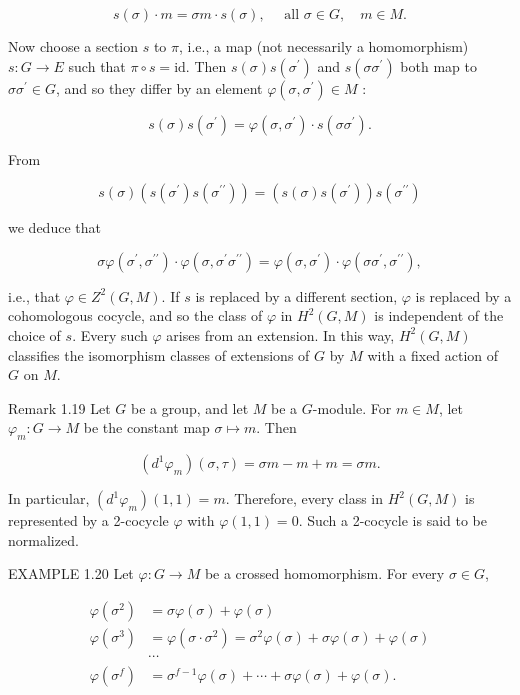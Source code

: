 \documentclass[10pt]{article}
\begin{document}
$$
s(\sigma) \cdot m=\sigma m \cdot s(\sigma), \quad \text { all } \sigma \in G, \quad m \in M .
$$

Now choose a section $s$ to $\pi$, i.e., a map (not necessarily a homomorphism) $s: G \rightarrow E$ such that $\pi \circ s=\mathrm{id}$. Then $s(\sigma) s\left(\sigma^{\prime}\right)$ and $s\left(\sigma \sigma^{\prime}\right)$ both map to $\sigma \sigma^{\prime} \in G$, and so they differ by an element $\varphi\left(\sigma, \sigma^{\prime}\right) \in M$ :

$$
s(\sigma) s\left(\sigma^{\prime}\right)=\varphi\left(\sigma, \sigma^{\prime}\right) \cdot s\left(\sigma \sigma^{\prime}\right) .
$$

From

$$
s(\sigma)\left(s\left(\sigma^{\prime}\right) s\left(\sigma^{\prime \prime}\right)\right)=\left(s(\sigma) s\left(\sigma^{\prime}\right)\right) s\left(\sigma^{\prime \prime}\right)
$$

we deduce that

$$
\sigma \varphi\left(\sigma^{\prime}, \sigma^{\prime \prime}\right) \cdot \varphi\left(\sigma, \sigma^{\prime} \sigma^{\prime \prime}\right)=\varphi\left(\sigma, \sigma^{\prime}\right) \cdot \varphi\left(\sigma \sigma^{\prime}, \sigma^{\prime \prime}\right),
$$

i.e., that $\varphi \in Z^{2}(G, M)$. If $s$ is replaced by a different section, $\varphi$ is replaced by a cohomologous cocycle, and so the class of $\varphi$ in $H^{2}(G, M)$ is independent of the choice of $s$. Every such $\varphi$ arises from an extension. In this way, $H^{2}(G, M)$ classifies the isomorphism classes of extensions of $G$ by $M$ with a fixed action of $G$ on $M$.

Remark 1.19 Let $G$ be a group, and let $M$ be a $G$-module. For $m \in M$, let $\varphi_{m}: G \rightarrow M$ be the constant map $\sigma \mapsto m$. Then

$$
\left(d^{1} \varphi_{m}\right)(\sigma, \tau)=\sigma m-m+m=\sigma m .
$$

In particular, $\left(d^{1} \varphi_{m}\right)(1,1)=m$. Therefore, every class in $H^{2}(G, M)$ is represented by a 2-cocycle $\varphi$ with $\varphi(1,1)=0$. Such a 2-cocycle is said to be normalized.

EXAMPLE 1.20 Let $\varphi: G \rightarrow M$ be a crossed homomorphism. For every $\sigma \in G$,

$$
\begin{aligned}
\varphi\left(\sigma^{2}\right) & =\sigma \varphi(\sigma)+\varphi(\sigma) \\
\varphi\left(\sigma^{3}\right) & =\varphi\left(\sigma \cdot \sigma^{2}\right)=\sigma^{2} \varphi(\sigma)+\sigma \varphi(\sigma)+\varphi(\sigma) \\
& \cdots \\
\varphi\left(\sigma^{f}\right) & =\sigma^{f-1} \varphi(\sigma)+\cdots+\sigma \varphi(\sigma)+\varphi(\sigma) .
\end{aligned}
$$
\end{document}
